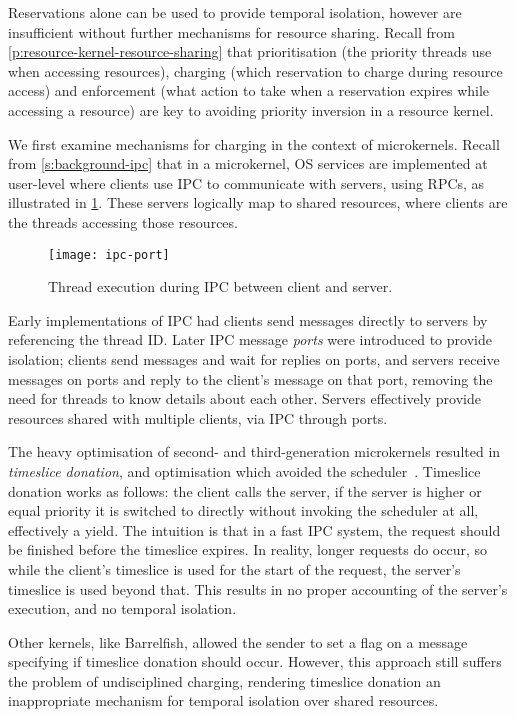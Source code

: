 Reservations alone can be used to provide temporal isolation, however are insufficient without
further mechanisms for resource sharing. Recall from \cref{p:resource-kernel-resource-sharing} that
prioritisation (the priority threads use when accessing resources), charging (which reservation to
charge during resource access) and enforcement (what action to take when a reservation expires while
accessing a resource) are key to avoiding priority inversion in a resource kernel.

We first examine mechanisms for charging in the context of microkernels.
Recall from \cref{s:background-ipc} that in a microkernel, \gls{OS} services are implemented at
user-level where clients use \gls{IPC} to communicate with servers, using \glspl{RPC}, as
illustrated in \cref{f:os-ipc}. These servers logically map to shared resources, where clients are
the threads accessing those resources.

\begin{figure}
    \centering
    \texttt{[image: ipc-port]}
    \caption[Thread execution during IPC.]{Thread execution during IPC between client and server.}
    \label{f:os-ipc}
\end{figure}

Early implementations of IPC had clients send messages directly to servers by referencing the
thread ID. Later IPC message \emph{ports} were introduced to provide isolation; clients send
messages and wait for replies on ports, and servers receive messages on ports and reply to the
client's message on that port, removing the need for threads to know details about each other. 
Servers effectively provide resources shared with multiple clients, via IPC through ports. 

The heavy optimisation of second- and third-generation microkernels resulted in \emph{timeslice
donation}, and optimisation which avoided the scheduler~\citep{Heiser_Elphinstone_16}. 
Timeslice donation works as follows: the client calls the server, if the server is higher or equal
priority it is switched to directly without invoking the scheduler at all, effectively a yield.
The intuition is that in
a fast IPC system, the request should be finished before the timeslice expires. In reality, longer
requests do occur, so while the client's timeslice is used for the start of the request, the server's
timeslice is used beyond that. This results in no
proper accounting of the server's execution, and no temporal isolation.

Other kernels, like Barrelfish, allowed the sender to set a flag on a message specifying if
timeslice donation should occur. However, this approach still suffers the problem of undisciplined 
charging, rendering timeslice donation an inappropriate mechanism for temporal isolation over
shared resources.

